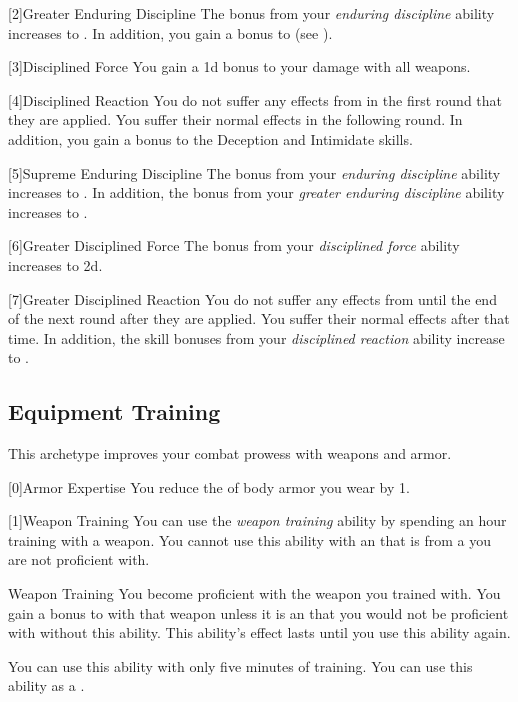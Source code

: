         [2]{Greater Enduring Discipline}
        The bonus from your \textit{enduring discipline} ability increases to .
        In addition, you gain a  bonus to  (see ).

        [3]{Disciplined Force}
        You gain a \plus1d bonus to your damage with all weapons.

        [4]{Disciplined Reaction}
        You do not suffer any effects from  in the first round that they are applied.
        You suffer their normal effects in the following round.
        In addition, you gain a  bonus to the Deception and Intimidate skills.

        [5]{Supreme Enduring Discipline}
        The bonus from your \textit{enduring discipline} ability increases to .
        In addition, the bonus from your \textit{greater enduring discipline} ability increases to .

        [6]{Greater Disciplined Force} The bonus from your \textit{disciplined force} ability increases to \plus2d.

        [7]{Greater Disciplined Reaction}
        You do not suffer any effects from  until the end of the next round after they are applied.
        You suffer their normal effects after that time.
        In addition, the skill bonuses from your \textit{disciplined reaction} ability increase to .

    \newpage
    \subsection{Equipment Training}
        This archetype improves your combat prowess with weapons and armor.

        [0]{Armor Expertise} You reduce the  of body armor you wear by 1.

        [1]{Weapon Training} You can use the \textit{weapon training} ability by spending an hour training with a weapon.
        You cannot use this ability with an  that is from a  you are not proficient with.
        \begin{freeability}{Weapon Training}
            You become proficient with the weapon you trained with.
            You gain a  bonus to  with that weapon unless it is an  that you would not be proficient with without this ability.
            This ability's effect lasts until you use this ability again.

            \rankline
             You can use this ability with only five minutes of training.
             You can use this ability as a .
        \end{freeability}

